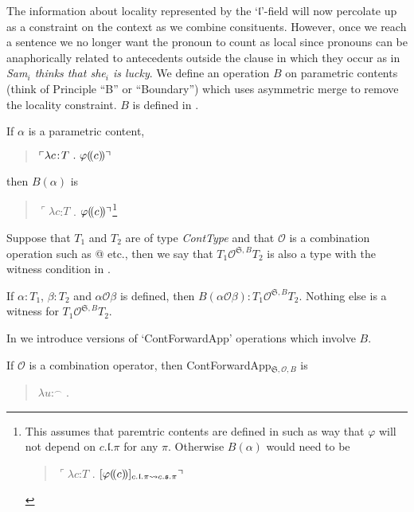 The information about locality represented by the
`$\mathfrak{l}$'-field will now percolate up as a constraint on the
context as we combine consituents.  However, once we reach a sentence
we no longer want the pronoun to count as local since pronouns can be
anaphorically related to antecedents outside the clause in which they
occur as in \textit{Sam$_i$ thinks that she$_i$ is lucky}. We define
an operation $B$ on parametric contents (think of Principle ``B'' or
``Boundary'') which uses asymmetric merge to remove the locality
constraint.  $B$ is defined in \nexteg{}.
\begin{ex} 
  If $\alpha$ is a parametric content,
  \begin{quote}
    $\ulcorner\lambda c\!:\!T\ .\ \varphi\dep{c}\urcorner$
  \end{quote}
  then $B(\alpha)$ is
  \begin{quote}
    $\ulcorner\lambda c$:$T$\fbox{\d{$\wedge$}}
    . $\varphi(\!(c)\!)\urcorner$\footnote{This assumes that paremtric
      contents are defined in such as way that $\varphi$ will not
      depend on $c.\mathfrak{l}.\pi$ for any $\pi$.  Otherwise
      $B(\alpha)$ would need to be
      \begin{quote}
        $\ulcorner\lambda c$:$T$\fbox{\d{$\wedge$}}
        . $[\varphi(\!(c)\!)]_{c.\mathfrak{l}.\pi\leadsto c.\mathfrak{s}.\pi}\urcorner$
      \end{quote}}
      
    
  \end{quote}
  
\end{ex}
Suppose that $T_1$ and $T_2$ are of type \textit{ContType} and that
$\mathcal{O}$ is a combination operation such as @ etc., then we say
that $T_1\mathcal{O}^{\mathfrak{S},B}T_2$ is also a type with the
witness condition in \nexteg{}.
\begin{ex} 
If $\alpha:T_1$, $\beta:T_2$ and $\alpha\mathcal{O}\beta$ is defined,
then $B(\alpha\mathcal{O}\beta):T_1\mathcal{O}^{\mathfrak{S},B}T_2$.
Nothing else is a witness for $T_1\mathcal{O}^{\mathfrak{S},B}T_2$. 
\end{ex} 
In \nexteg{} we introduce versions of `ContForwardApp' operations
which involve $B$.
\begin{ex} 
  If $\mathcal{O}$ is a combination operator, then
  ContForwardApp$_{\mathfrak{S},\mathcal{O},B}$ is
  \begin{quote}
    $\lambda u$:$^\frown$ . 
  \end{quote}
  \end{ex} 
